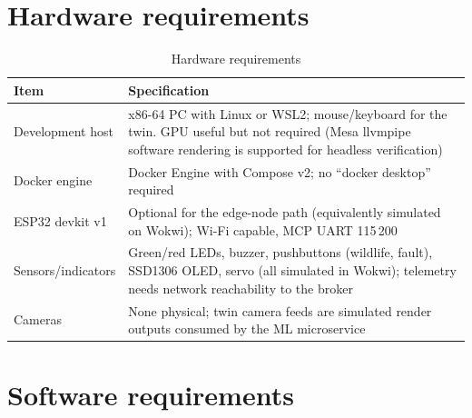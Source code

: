 \section{Hardware requirements}

\begin{longtable}{>{\raggedright}p{4.5cm} >{\raggedright\arraybackslash}p{9.0cm}}
\caption{Hardware requirements}\label{tab:hardware}\\
\toprule
\textbf{Item} & \textbf{Specification} \\
\midrule
Development host & x86-64 PC with Linux or WSL2; mouse/keyboard for the twin. GPU useful but not required (Mesa llvmpipe software rendering is supported for headless verification) \\
Docker engine & Docker Engine with Compose v2; no ``docker desktop'' required \\
ESP32 devkit v1 & Optional for the edge-node path (equivalently simulated on Wokwi); Wi-Fi capable, MCP UART 115\,200 \\
Sensors/indicators & Green/red LEDs, buzzer, pushbuttons (wildlife, fault), SSD1306 OLED, servo (all simulated in Wokwi); telemetry needs network reachability to the broker \\
Cameras & None physical; twin camera feeds are simulated render outputs consumed by the ML microservice \\
\bottomrule
\end{longtable}

\section{Software requirements}

